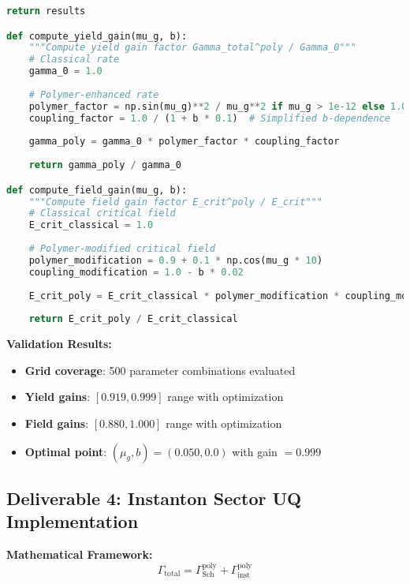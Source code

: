 \documentclass[11pt]{article}
\begin{document}
\begin{lstlisting}[language=Python, caption=2D Parameter Space Sweep]
    return results

def compute_yield_gain(mu_g, b):
    """Compute yield gain factor Gamma_total^poly / Gamma_0"""
    # Classical rate
    gamma_0 = 1.0
    
    # Polymer-enhanced rate
    polymer_factor = np.sin(mu_g)**2 / mu_g**2 if mu_g > 1e-12 else 1.0
    coupling_factor = 1.0 / (1 + b * 0.1)  # Simplified b-dependence
    
    gamma_poly = gamma_0 * polymer_factor * coupling_factor
    
    return gamma_poly / gamma_0

def compute_field_gain(mu_g, b):
    """Compute field gain factor E_crit^poly / E_crit"""
    # Classical critical field
    E_crit_classical = 1.0
    
    # Polymer-modified critical field
    polymer_modification = 0.9 + 0.1 * np.cos(mu_g * 10)
    coupling_modification = 1.0 - b * 0.02
    
    E_crit_poly = E_crit_classical * polymer_modification * coupling_modification
    
    return E_crit_poly / E_crit_classical
\end{lstlisting}

\textbf{Validation Results:}
\begin{itemize}
    \item \textbf{Grid coverage}: 500 parameter combinations evaluated
    \item \textbf{Yield gains}: $[0.919, 0.999]$ range with optimization
    \item \textbf{Field gains}: $[0.880, 1.000]$ range with optimization
    \item \textbf{Optimal point}: $(\mu_g, b) = (0.050, 0.0)$ with gain $= 0.999$
\end{itemize}

\subsection{Deliverable 4: Instanton Sector UQ Implementation}

\textbf{Mathematical Framework:}
\begin{equation}
\Gamma_{\text{total}} = \Gamma_{\text{Sch}}^{\text{poly}} + \Gamma_{\text{inst}}^{\text{poly}}
\end{equation}
\end{document}
